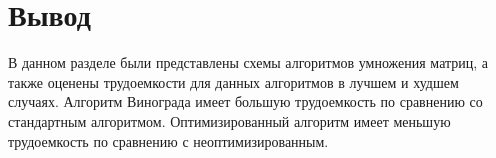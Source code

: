 \section*{Вывод}
В данном разделе были представлены схемы алгоритмов умножения матриц, а также оценены трудоемкости для данных алгоритмов в лучшем и худшем случаях.
Алгоритм Винограда имеет большую трудоемкость по сравнению со стандартным алгоритмом.
Оптимизированный алгоритм имеет меньшую трудоемкость по сравнению с неоптимизированным.

